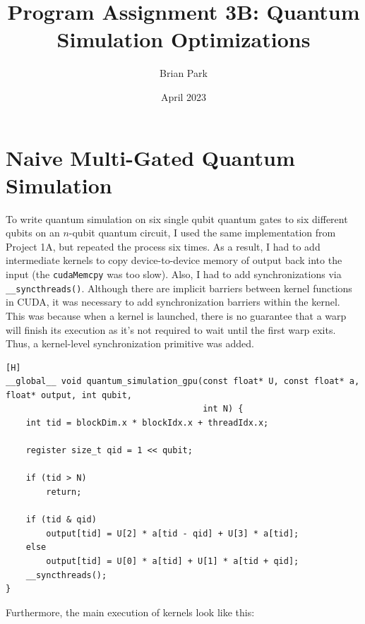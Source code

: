 \documentclass{article}
\title{Program Assignment 3B: Quantum Simulation Optimizations}
\author{Brian Park}
\affil{North Carolina State University, Computer Engineering 786}
\date{April 2023}
\begin{document}
\maketitle

\section{Naive Multi-Gated Quantum Simulation}
To write quantum simulation on six single qubit quantum gates to six different qubits on an $n$-qubit quantum circuit, I used the same implementation from Project 1A, but repeated the process six times. As a result, I had to add intermediate kernels to copy device-to-device memory of output back into the input (the \verb|cudaMemcpy| was too slow). Also, I had to add synchronizations via \verb|__syncthreads()|. Although there are implicit barriers between kernel functions in CUDA, it was necessary to add synchronization barriers within the kernel. This was because when a kernel is launched, there is no guarantee that a warp will finish its execution as it's not required to wait until the first warp exits. Thus, a kernel-level synchronization primitive was added. 

\begin{verbatim}[H]
__global__ void quantum_simulation_gpu(const float* U, const float* a, float* output, int qubit,
                                       int N) {
    int tid = blockDim.x * blockIdx.x + threadIdx.x;

    register size_t qid = 1 << qubit;

    if (tid > N)
        return;

    if (tid & qid)
        output[tid] = U[2] * a[tid - qid] + U[3] * a[tid];
    else
        output[tid] = U[0] * a[tid] + U[1] * a[tid + qid];
    __syncthreads();
}
\end{verbatim}

Furthermore, the main execution of kernels look like this:
\end{document}
